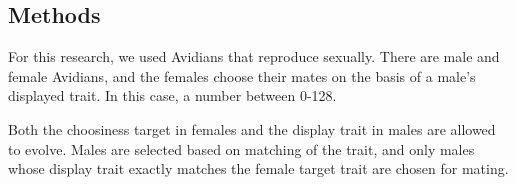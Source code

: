\subsection{Methods}

For this research, we used Avidians that reproduce sexually. There are male and female Avidians, and the females choose their mates on the basis of a male’s displayed trait. In this case, a number between 0-128.

Both the choosiness target in females and the display trait in males are allowed to evolve. Males are selected based on matching of the trait, and only males whose display trait exactly matches the female target trait are chosen for mating.